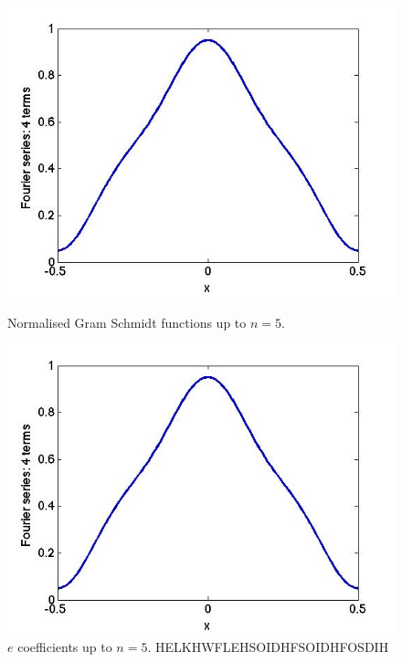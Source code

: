 \documentclass{article}
\begin{document}
\begin{figure}[ht]
\centering
	\begin{minipage}[c][][b]{0.45\linewidth}
		\begin{center}
		\includegraphics[scale=0.35]{fs_triangle4.jpg}  
		\end{center}
		\caption[b]{Normalised Gram Schmidt functions up to $n=5$.}
		\label{fig:minipage1}
	\end{minipage}
\quad\quad\quad\quad
	\begin{minipage}[c][][b]{0.45\linewidth}
		\begin{center}
		\includegraphics[scale=0.35]{fs_triangle4.jpg}
		\end{center}
		\caption[b]{$e$ coefficients up to $n=5$. HELKHWFLEHSOIDHFSOIDHFOSDIH}
		\label{fig:minipage2}
	\end{minipage}
\end{figure}
\end{document}
